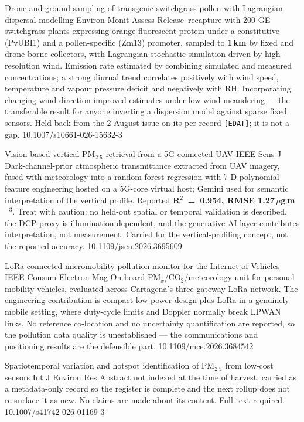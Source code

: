 \documentclass[10pt]{article}
\begin{document}
{Drone and ground sampling of transgenic switchgrass pollen with Lagrangian dispersal modelling}
{Environ Monit Assess}
{Release--recapture with 200 GE switchgrass plants expressing orange fluorescent protein
under a constitutive (PvUBI1) and a pollen-specific (Zm13) promoter, sampled to
\textbf{1\,km} by fixed and drone-borne collectors, with Lagrangian stochastic simulation
driven by high-resolution wind. Emission rate estimated by combining simulated and
measured concentrations; a strong diurnal trend correlates positively with wind speed,
temperature and vapour pressure deficit and negatively with RH. Incorporating changing
wind direction improved estimates under low-wind meandering --- the transferable result for
anyone inverting a dispersion model against sparse fixed sensors. Held back from the
2 August issue on its per-record \texttt{[EDAT]}; it is not a gap.}
{10.1007/s10661-026-15632-3}

{Vision-based vertical PM$_{2.5}$ retrieval from a 5G-connected UAV}
{IEEE Sens J}
{Dark-channel-prior atmospheric transmittance extracted from UAV imagery, fused with
meteorology into a random-forest regression with 7-D polynomial feature engineering hosted
on a 5G-core virtual host; Gemini used for semantic interpretation of the vertical
profile. Reported \textbf{R$^2$~=~0.954, RMSE 1.27\,$\mu$g\,m$^{-3}$}. Treat with caution:
no held-out spatial or temporal validation is described, the DCP proxy is
illumination-dependent, and the generative-AI layer contributes interpretation, not
measurement. Carried for the vertical-profiling concept, not the reported accuracy.}
{10.1109/jsen.2026.3695609}

{LoRa-connected micromobility pollution monitor for the Internet of Vehicles}
{IEEE Consum Electron Mag}
{On-board PM$_x$/CO$_2$/meteorology unit for personal mobility vehicles, evaluated across
Cartagena's three-gateway LoRa network. The engineering contribution is compact low-power
design plus LoRa in a genuinely mobile setting, where duty-cycle limits and Doppler
normally break LPWAN links. No reference co-location and no uncertainty quantification are
reported, so the pollution data quality is unestablished --- the communications and
positioning results are the defensible part.}
{10.1109/mce.2026.3684542}

{Spatiotemporal variation and hotspot identification of PM$_{2.5}$ from low-cost sensors}
{Int J Environ Res}
{Abstract not indexed at the time of harvest; carried as a metadata-only record so the
register is complete and the next rollup does not re-surface it as new. No claims are made
about its content. Full text required.}
{10.1007/s41742-026-01169-3}
\end{document}
